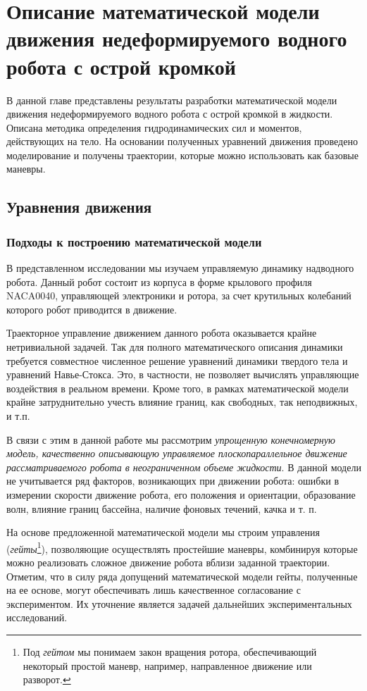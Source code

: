 \chapter{Описание математической модели движения недеформируемого водного робота с острой кромкой}\label{ch:ch6}

В данной главе представлены результаты разработки математической модели движения недеформируемого водного робота с острой кромкой в жидкости. Описана методика определения гидродинамических сил и моментов, действующих на тело. На основании полученных уравнений движения проведено моделирование и получены траектории, которые можно использовать как  базовые маневры.

\section{Уравнения движения}

\subsection{Подходы к построению математической модели}


В представленном исследовании мы изучаем управляемую динамику надводного робота. Данный робот состоит из корпуса в форме крылового профиля NACA0040, управляющей электроники и ротора, за счет крутильных колебаний которого робот приводится в движение. 

Траекторное управление движением данного робота оказывается крайне нетривиальной задачей. Так для полного математического описания динамики требуется совместное численное решение уравнений динамики твердого тела и уравнений Навье-Стокса. Это, в частности, не позволяет вычислять управляющие воздействия в реальном времени. Кроме того, в рамках математической модели крайне затруднительно учесть влияние границ, как свободных, так неподвижных, и т.п.

В связи с этим в данной работе мы рассмотрим \textit{упрощенную конечномерную модель, качественно описывающую управляемое плоскопараллельное движение рассматриваемого робота в неограниченном объеме жидкости}. В данной модели не учитывается ряд факторов, возникающих при движении робота: ошибки в измерении скорости движение робота, его положения и ориентации, образование волн, влияние границ бассейна, наличие фоновых течений, качка и т. п.

На основе предложенной математической модели мы строим управления (\textit{гейты}\footnote{Под \textit{гейтом} мы понимаем закон вращения ротора, обеспечивающий некоторый простой маневр, например, направленное движение или разворот.}), позволяющие осуществлять простейшие маневры, комбинируя которые можно реализовать сложное движение робота вблизи заданной траектории. Отметим, что в силу ряда допущений математической модели гейты, полученные на ее основе, могут обеспечивать лишь качественное согласование с экспериментом. Их уточнение является задачей дальнейших экспериментальных исследований.

